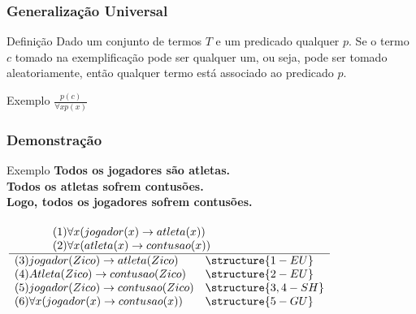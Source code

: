 \documentclass[aspectratio=169]{beamer} %
\begin{document}
\begin{frame}
\frametitle{Generalização Universal}

\begin{block}{Definição}
Dado um conjunto de termos $T$ e um predicado qualquer $p$. Se o termo $c$ tomado na exemplificação pode ser qualquer um, ou seja, pode ser tomado
aleatoriamente, então qualquer termo está associado ao predicado $p$.
\end{block}\vfill

\begin{exampleblock}{Exemplo}
	\Large
		$\frac{p(c)}{ \forall x p(x)}$
\end{exampleblock}
\end{frame}

\begin{frame}
\frametitle{Demonstração}

\begin{exampleblock}{Exemplo}
	\textbf{Todos os jogadores são atletas.}\\
	\textbf{Todos os atletas sofrem contusões.}\\
	\textbf{Logo, todos os jogadores sofrem contusões.}\\~\\

	$\frac{
		     \begin{array}{ll} 
			(1) \forall x (jogador(x) \rightarrow atleta(x)) &~~~~~~~~~~~~~~~~~\\ 
			(2) \forall x (atleta(x) \rightarrow contusao(x)) &
			\end{array}
		    }{
		    \begin{array}{ll} 
		    (3) jogador(Zico) \rightarrow atleta(Zico) & \structure{1 - EU}  \\ 
		    (4)  Atleta(Zico) \rightarrow contusao(Zico) & \structure{2 - EU}  \\ 
		    (5)  jogador(Zico) \rightarrow contusao(Zico)& \structure{3,4 - SH}  \\ 
		    (6)  \forall x(jogador(x) \rightarrow contusao(x)) & \structure{5 - GU}
		   \end{array}}$
\end{exampleblock}
\end{frame}
\end{document}
